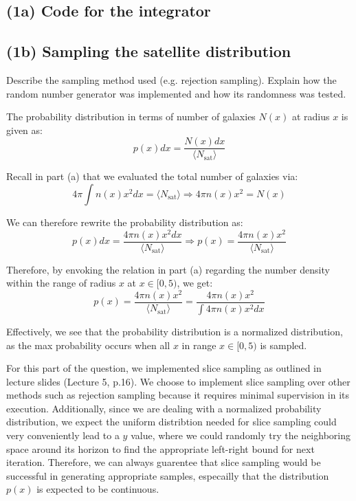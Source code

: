 \documentclass{article}
\begin{document}
  \subsection{(1a) Code for the integrator}
    
    \pagebreak

  \subsection{(1b) Sampling the satellite distribution}
    Describe the sampling method used (e.g. rejection sampling). Explain how the random 
    number generator was implemented and how its randomness was tested.

    The probability distribution in terms of number of galaxies $N(x)$ at radius $x$ is 
    given as:
    \begin{equation}
      p(x) dx = \frac{N(x) dx}{\langle N_\text{sat} \rangle}
    \end{equation}

    Recall in part (a) that we evaluated the total number of galaxies via:
    \begin{equation}
      4 \pi \int n(x) x^2 dx = \langle N_\text{sat} \rangle
      \Rightarrow 
      4 \pi n(x) x^2 = N(x)
    \end{equation}

    We can therefore rewrite the probability distribution as:
    \begin{equation}
      p(x) dx = \frac{4 \pi n(x) x^2 dx}{\langle N_\text{sat} \rangle}
      \Rightarrow
      p(x) = \frac{4 \pi n(x) x^2}{\langle N_\text{sat} \rangle}
    \end{equation}

    Therefore, by envoking the relation in part (a) regarding the number density within
    the range of radius $x$ at $x \in [0, 5)$, we get:
    \begin{equation}
      p(x) 
      = \frac{4 \pi n(x) x^2}{\langle N_\text{sat} \rangle}
      = \frac{4 \pi n(x) x^2}{\int 4 \pi n(x) x^2 dx}
    \end{equation}

    Effectively, we see that the probability distribution is a normalized distribution,
    as the max probability occurs when all $x$ in range $x \in [0, 5)$ is sampled. 
    
    For this part of the question, we implemented slice sampling as outlined in lecture
    slides (Lecture 5, p.16). We choose to implement slice sampling over other methods 
    such as rejection sampling because it requires minimal supervision in its execution.
    Additionally, since we are dealing with a normalized probability distribution, we 
    expect the uniform distribtion needed for slice sampling could very conveniently 
    lead to a $y$ value, where we could randomly try the neighboring space around its 
    horizon to find the appropriate left-right bound for next iteration. Therefore, we 
    can always guarentee that slice sampling would be successful in generating 
    appropriate samples, especailly that the distribution $p(x)$ is expected to be 
    continuous.
\end{document}
